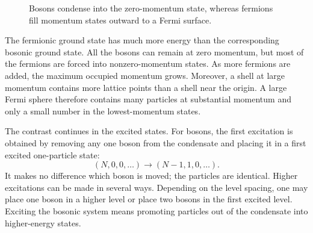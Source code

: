 \begin{figure}
\centering
{}
\caption{Bosons condense into the zero-momentum state, whereas fermions fill momentum states outward to a Fermi surface.}
\end{figure}

The fermionic ground state has much more energy than the corresponding bosonic ground state. All the bosons can remain at zero momentum, but most of the fermions are forced into nonzero-momentum states. As more fermions are added, the maximum occupied momentum grows. Moreover, a shell at large momentum contains more lattice points than a shell near the origin. A large Fermi sphere therefore contains many particles at substantial momentum and only a small number in the lowest-momentum states.

The contrast continues in the excited states. For bosons, the first excitation is obtained by removing any one boson from the condensate and placing it in a first excited one-particle state:
\begin{equation}
(N,0,0,\ldots)\longrightarrow (N-1,1,0,\ldots).
\end{equation}
It makes no difference which boson is moved; the particles are identical. Higher excitations can be made in several ways. Depending on the level spacing, one may place one boson in a higher level or place two bosons in the first excited level. Exciting the bosonic system means promoting particles out of the condensate into higher-energy states.

